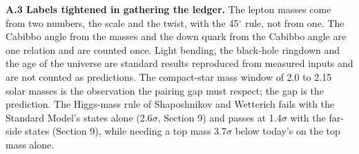 \documentclass[
  11pt,
]{article}
\begin{document}
\textbf{A.3 Labels tightened in gathering the ledger.} The lepton masses come from two numbers, the scale and the twist, with the 45\ensuremath{^\circ} rule, not from one. The Cabibbo angle from the masses and the down quark from the Cabibbo angle are one relation and are counted once. Light bending, the black-hole ringdown and the age of the universe are standard results reproduced from measured inputs and are not counted as predictions. The compact-star mass window of 2.0 to 2.15 solar masses is the observation the pairing gap must respect; the gap is the prediction. The Higgs-mass rule of Shaposhnikov and Wetterich fails with the Standard Model's states alone (2.6\ensuremath{\sigma}, Section 9) and passes at 1.4\ensuremath{\sigma} with the far-side states (Section 9), while needing a top mass 3.7\ensuremath{\sigma} below today's on the top mass alone.
\end{document}
